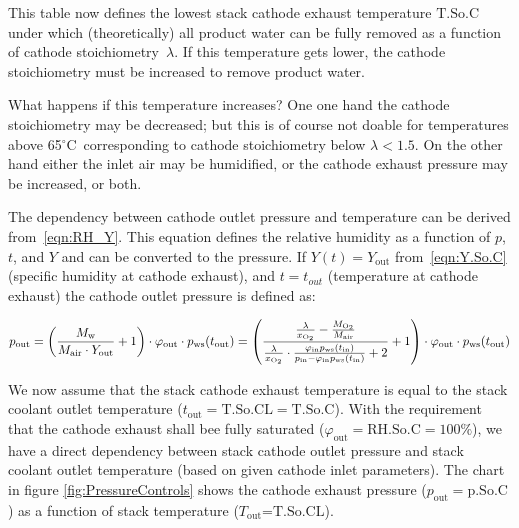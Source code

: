 \documentclass[11pt,a4paper,english,twoside]{scrreprt}
\newcommand{\gradC}{${}^\circ$C}      %
\begin{document}
This table now defines the lowest stack cathode exhaust temperature $\mathrm{T.So.C}$ under which (theoretically) all product water can be fully removed as a function of cathode stoichiometry~$\lambda$. If this temperature gets lower, the cathode stoichiometry must be increased to remove product water. 

What happens if this temperature increases? One one hand the cathode stoichiometry may be decreased; but this is of course not doable for temperatures above 65\gradC\ corresponding to cathode stoichiometry below $\lambda < 1.5$. On the other hand either the inlet air may be humidified, or the cathode exhaust pressure may be increased, or both.

The dependency between cathode outlet pressure and temperature can be derived from~\ref{eqn:RH_Y}. This equation defines the relative humidity as a function of $p$, $t$, and $Y$ and can be converted to the pressure. If $Y(t) = Y_\text{out}$ from~\ref{eqn:Y.So.C} (specific humidity at cathode exhaust), and $t=t_{out}$ (temperature at cathode exhaust) the cathode outlet pressure is defined as:

\[
  p_\text{out} = \left(\frac{M_\text{w}}{M_\text{air} \cdot Y_\text{out}} + 1\right) \cdot \varphi_\text{out} \cdot p_\text{ws} (t_\text{out}) 
							= \left(\frac{\frac{\lambda}{x_{\ce{O2}}} - \frac{M_{\ce{O2}}}{M_\text{air}}}{\frac{\lambda}{x_{\ce{O2}}} \cdot \frac{\varphi_\text{in}p_\text{ws} (t_\text{in})}{p_\text{in} - \varphi_\text{in} p_\text{ws} (t_\text{in})} + 2} + 1\right) \cdot \varphi_\text{out} \cdot p_\text{ws} (t_\text{out}) 
\]

We now assume that the stack cathode exhaust temperature is equal to the stack coolant outlet temperature ($t_\text{out}=\mathrm{T.So.CL}=\mathrm{T.So.C}$). With the requirement that the cathode exhaust shall bee fully saturated ($\varphi_\text{out}=\mathrm{RH.So.C} = 100\%$), we have a direct dependency between stack cathode outlet pressure and stack coolant outlet temperature (based on given cathode inlet parameters). The chart in figure \ref{fig:PressureControls} shows the cathode exhaust pressure ($p_\text{out}=\mathrm{p.So.C}$) as a function of stack temperature ($T_\text{out}$=$\mathrm{T.So.CL}$).
\end{document}

